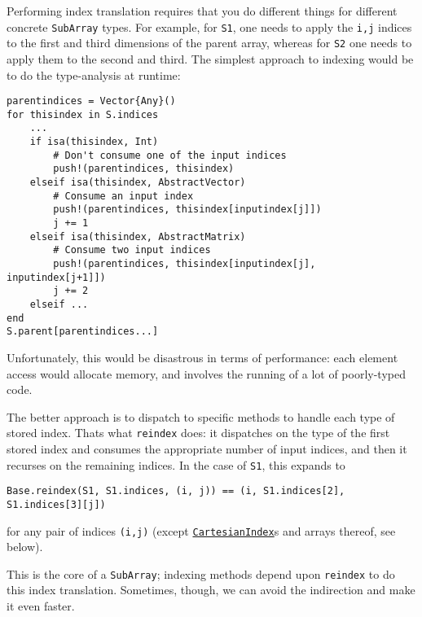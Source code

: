 Performing index translation requires that you do different things for different concrete \texttt{SubArray} types.  For example, for \texttt{S1}, one needs to apply the \texttt{i,j} indices to the first and third dimensions of the parent array, whereas for \texttt{S2} one needs to apply them to the second and third.  The simplest approach to indexing would be to do the type-analysis at runtime:




\begin{verbatim}
parentindices = Vector{Any}()
for thisindex in S.indices
    ...
    if isa(thisindex, Int)
        # Don't consume one of the input indices
        push!(parentindices, thisindex)
    elseif isa(thisindex, AbstractVector)
        # Consume an input index
        push!(parentindices, thisindex[inputindex[j]])
        j += 1
    elseif isa(thisindex, AbstractMatrix)
        # Consume two input indices
        push!(parentindices, thisindex[inputindex[j], inputindex[j+1]])
        j += 2
    elseif ...
end
S.parent[parentindices...]
\end{verbatim}



Unfortunately, this would be disastrous in terms of performance: each element access would allocate memory, and involves the running of a lot of poorly-typed code.



The better approach is to dispatch to specific methods to handle each type of stored index. That{\textquotesingle}s what \texttt{reindex} does: it dispatches on the type of the first stored index and consumes the appropriate number of input indices, and then it recurses on the remaining indices. In the case of \texttt{S1}, this expands to




\begin{verbatim}
Base.reindex(S1, S1.indices, (i, j)) == (i, S1.indices[2], S1.indices[3][j])
\end{verbatim}



for any pair of indices \texttt{(i,j)} (except \hyperlink{4571802376991525093}{\texttt{CartesianIndex}}s and arrays thereof, see below).



This is the core of a \texttt{SubArray}; indexing methods depend upon \texttt{reindex} to do this index translation. Sometimes, though, we can avoid the indirection and make it even faster.



